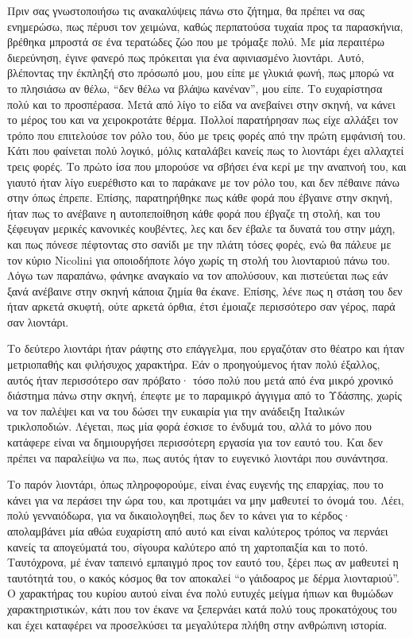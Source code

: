Πριν σας γνωστοποιήσω τις ανακαλύψεις πάνω στο ζήτημα, θα πρέπει να σας ενημερώσω, πως πέρυσι τον χειμώνα, καθώς περπατούσα τυχαία προς τα παρασκήνια, βρέθηκα μπροστά σε ένα τερατώδες ζώο που με τρόμαξε πολύ. Με μία περαιτέρω διερεύνηση, έγινε φανερό πως πρόκειται για ένα αφινιασμένο λιοντάρι. Αυτό, βλέποντας την έκπληξή στο πρόσωπό μου, μου είπε με γλυκιά φωνή, πως μπορώ να το πλησιάσω αν θέλω, \enquote{δεν θέλω να βλάψω κανέναν}, μου είπε. Το ευχαρίστησα πολύ και το προσπέρασα. Μετά από λίγο το είδα να ανεβαίνει στην σκηνή, να κάνει το μέρος του και να χειροκροτάτε θέρμα. Πολλοί παρατήρησαν πως είχε αλλάξει τον τρόπο που επιτελούσε τον ρόλο του, δύο με τρεις φορές από την πρώτη εμφάνισή του. Κάτι που φαίνεται πολύ λογικό, μόλις καταλάβει κανείς πως το λιοντάρι έχει αλλαχτεί τρεις φορές. Το πρώτο ίσα που μπορούσε να σβήσει ένα κερί με την αναπνοή του, και γιαυτό ήταν λίγο ευερέθιστο και το παράκανε με τον ρόλο του, και δεν πέθαινε πάνω στην όπως έπρεπε. Επίσης, παρατηρήθηκε πως κάθε φορά που έβγαινε στην σκηνή, ήταν πως το ανέβαινε η αυτοπεποίθηση κάθε φορά που έβγαζε τη στολή, και του ξέφευγαν μερικές κανονικές κουβέντες, λες και δεν έβαλε τα δυνατά του στην μάχη, και πως πόνεσε πέφτοντας στο σανίδι με την πλάτη τόσες φορές, ενώ θα πάλευε με τον κύριο Nicolini για οποιοδήποτε λόγο χωρίς τη στολή του λιονταριού πάνω του. Λόγω των παραπάνω, φάνηκε αναγκαίο να τον απολύσουν, και πιστεύεται πως εάν ξανά ανέβαινε στην σκηνή κάποια ζημία θα έκανε. Επίσης, λένε πως η στάση του δεν ήταν αρκετά σκυφτή, ούτε αρκετά όρθια, έτσι έμοιαζε περισσότερο σαν γέρος, παρά σαν λιοντάρι.

Το δεύτερο λιοντάρι ήταν ράφτης στο επάγγελμα, που εργαζόταν στο θέατρο και ήταν μετριοπαθής και φιλήσυχος χαρακτήρα. Εάν ο προηγούμενος ήταν πολύ έξαλλος, αυτός ήταν περισσότερο σαν πρόβατο· τόσο πολύ που μετά από ένα μικρό χρονικό διάστημα πάνω στην σκηνή, έπεφτε με το παραμικρό άγγιγμα από το Υδάσπης, χωρίς να τον παλέψει και να του δώσει την ευκαιρία για την ανάδειξη Ιταλικών τρικλοποδιών. Λέγεται, πως μία φορά έσκισε το ένδυμά του, αλλά το μόνο που κατάφερε είναι να δημιουργήσει περισσότερη εργασία για τον εαυτό του. Και δεν πρέπει να παραλείψω να πω, πως αυτός ήταν το ευγενικό λιοντάρι που συνάντησα.

Το παρόν λιοντάρι, όπως πληροφορούμε, είναι ένας ευγενής της επαρχίας, που το κάνει για να περάσει την ώρα του, και προτιμάει να μην μαθευτεί το όνομά του. Λέει, πολύ γενναιόδωρα, για να δικαιολογηθεί, πως δεν το κάνει για το κέρδος· απολαμβάνει μία αθώα ευχαρίστη από αυτό και είναι καλύτερος τρόπος να περνάει κανείς τα απογεύματά του, σίγουρα καλύτερο από τη χαρτοπαιξία και το ποτό. Ταυτόχρονα, μέ έναν ταπεινό εμπαιγμό προς τον εαυτό του, ξέρει πως αν μαθευτεί η ταυτότητά του, ο κακός κόσμος θα τον αποκαλεί \enquote{ο γάιδοαρος με δέρμα λιονταριού}. Ο χαρακτήρας του κυρίου αυτού είναι ένα πολύ ευτυχές μείγμα ήπιων και θυμώδων χαρακτηριστικών, κάτι που τον έκανε να ξεπερνάει κατά πολύ τους προκατόχους του και έχει καταφέρει να προσελκύσει τα μεγαλύτερα πλήθη στην ανθρώπινη ιστορία.

